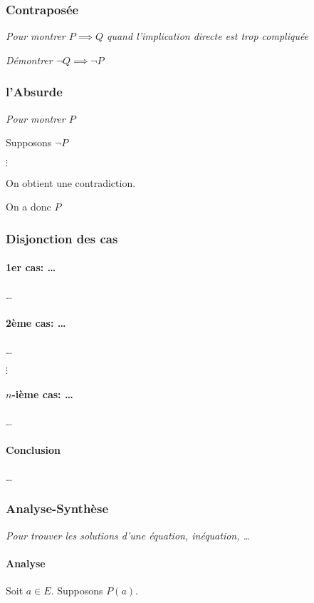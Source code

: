 \documentclass{article}
\begin{document}
\subsubsection{Contraposée}
\emph{Pour montrer $P \implies Q$ quand l'implication directe est trop compliquée}

\emph{Démontrer $\lnot Q \implies \lnot P$} 

\subsubsection{l'Absurde}

\emph{Pour montrer $P$} 

Supposons $\lnot P$

$\vdots$

On obtient une contradiction.

On a donc $P$

\subsubsection{Disjonction des cas}

\paragraph{1er cas: \ldots} \ldots

\paragraph{2ème cas: \ldots} \ldots

$\vdots$

\paragraph{$n$-ième cas: \ldots} \ldots

\paragraph{Conclusion}
\ldots

\subsubsection{Analyse-Synthèse}
\emph{Pour trouver les solutions d'une équation, inéquation, \ldots}

\paragraph{Analyse}
Soit $a \in E$. Supposons $P(a)$.
\end{document}
